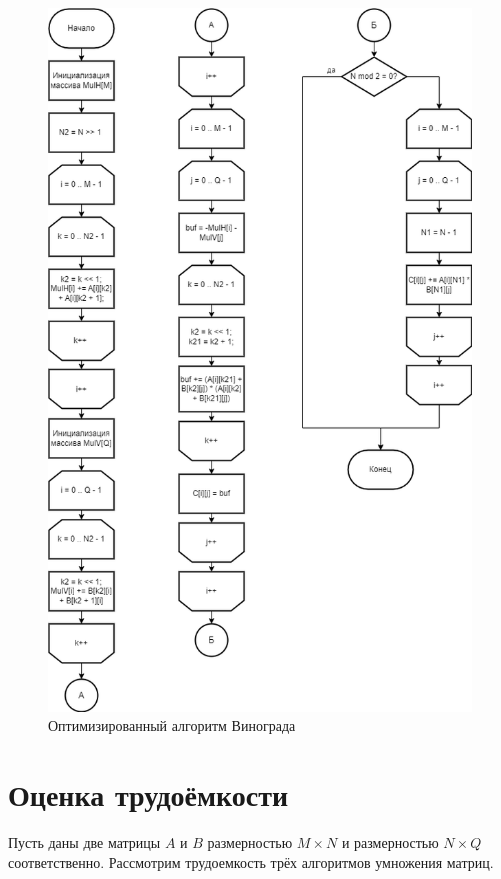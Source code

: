 \begin{figure}[H]
	\centering
	\includegraphics[scale=0.55]{inc/img/optvino}
	\caption{Оптимизированный алгоритм Винограда}
	\label{fig:optvino}
\end{figure}



\section{Оценка трудоёмкости}
Пусть даны две матрицы $A$ и $B$ размерностью $M\times N$ и размерностью $N \times Q$ соответственно. Рассмотрим трудоемкость трёх алгоритмов умножения матриц.

